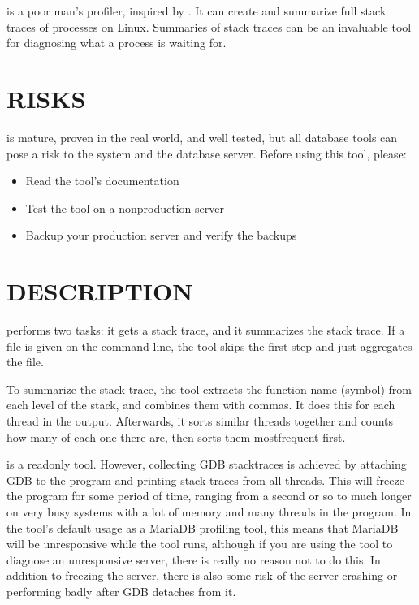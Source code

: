 \documentclass[letterpaper,10pt,english]{sphinxmanual}
\begin{document}
 is a poor man’s profiler, inspired by .
It can create and summarize full stack traces of processes on Linux.
Summaries of stack traces can be an invaluable tool for diagnosing what
a process is waiting for.


\section{RISKS}
\label{\detokenize{mariadb-stacktrace:risks}}
 is mature, proven in the real world, and well tested,
but all database tools can pose a risk to the system and the database
server.  Before using this tool, please:
\begin{itemize}
\item {} 
Read the tool’s documentation

\item {} 
Test the tool on a non\sphinxhyphen{}production server

\item {} 
Backup your production server and verify the backups

\end{itemize}


\section{DESCRIPTION}
\label{\detokenize{mariadb-stacktrace:description}}
 performs two tasks: it gets a stack trace, and it summarizes the stack
trace.  If a file is given on the command line, the tool skips the first step
and just aggregates the file.

To summarize the stack trace, the tool extracts the function name (symbol)
from each level of the stack, and combines them with commas.  It does this
for each thread in the output.  Afterwards, it sorts similar threads together
and counts how many of each one there are, then sorts them most\sphinxhyphen{}frequent first.

 is a read\sphinxhyphen{}only tool.  However, collecting GDB stacktraces is achieved by
attaching GDB to the program and printing stack traces from all threads. This
will freeze the program for some period of time, ranging from a second or so to
much longer on very busy systems with a lot of memory and many threads in the
program.  In the tool’s default usage as a MariaDB profiling tool, this means that
MariaDB will be unresponsive while the tool runs, although if you are using the
tool to diagnose an unresponsive server, there is really no reason not to do
this.  In addition to freezing the server, there is also some risk of the server
crashing or performing badly after GDB detaches from it.
\end{document}

